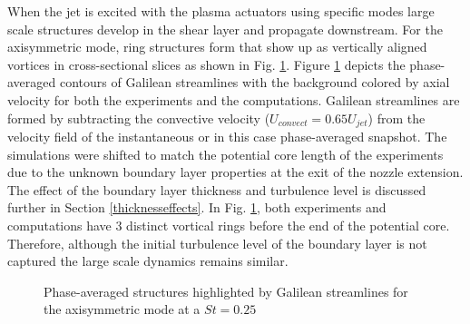 \documentclass[english]{aiaa-tc}
\begin{document}
When the jet is excited with the plasma actuators using specific modes large scale structures develop in the shear layer and propagate downstream. For the axisymmetric mode, ring structures form that show up as vertically aligned vortices in cross-sectional slices as shown in Fig. \ref{galilcomp}. Figure \ref{galilcomp} depicts the phase-averaged contours of Galilean streamlines with the background colored by axial velocity for both the experiments and the computations. Galilean streamlines are formed by subtracting the convective velocity ($U_{convect}=0.65U_{jet}$) from the velocity field of the instantaneous or in this case phase-averaged snapshot. The simulations were shifted to match the potential core length of the experiments due to the unknown boundary layer properties at the exit of the nozzle extension. The effect of the boundary layer thickness and turbulence level is discussed further in Section \ref{thicknesseffects}. In Fig. \ref{galilcomp}, both experiments and computations have 3 distinct vortical rings before the end of the potential core.  Therefore, although the initial turbulence level of the boundary layer is not captured the large scale dynamics remains similar. 
\begin{figure}
\begin{center}
\label{galilcomp}
\caption{Phase-averaged structures highlighted by Galilean streamlines for the axisymmetric mode at a $St=0.25$}
\end{center}
 \end{figure}
\end{document}

